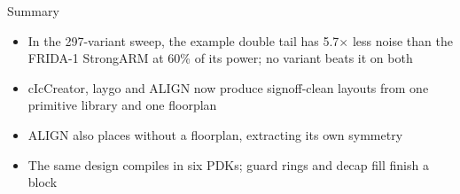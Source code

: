 \begin{frame}{Summary}
  {\small
  \begin{itemize}
    \item In the 297-variant sweep, the example double tail has 5.7$\times$ less noise than the FRIDA-1 StrongARM at 60\% of its power; no variant beats it on both
    \item cIcCreator, laygo and ALIGN now produce signoff-clean layouts from one primitive library and one floorplan
    \item ALIGN also places without a floorplan, extracting its own symmetry
    \item The same design compiles in six PDKs; guard rings and decap fill finish a block
  \end{itemize}
  }
\end{frame}


